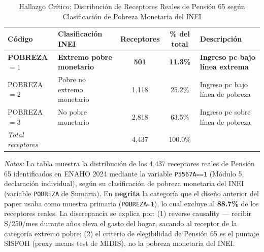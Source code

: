 \begin{table}[htbp]
\centering
\caption{Hallazgo Crítico: Distribución de Receptores Reales de Pensión 65 según Clasificación de Pobreza Monetaria del INEI}
\label{tab:pobreza_receptores}
\begin{threeparttable}
\begin{tabular}{l l cc l}
\toprule
Código & Clasificación INEI & Receptores & \% del total & Descripción \\
\midrule
  \textbf{POBREZA$=1$} & \textbf{Extremo pobre monetario} & \textbf{501} & \textbf{11.3\%} & \textbf{Ingreso pc bajo línea extrema} \\
  POBREZA$=2$ & Pobre no extremo monetario & 1{,}118 & 25.2\% & Ingreso pc bajo línea de pobreza \\
  POBREZA$=3$ & No pobre monetario & 2{,}818 & 63.5\% & Ingreso pc sobre línea de pobreza \\
\midrule
  \textit{Total receptores} & & 4{,}437 & 100.0\% & \\
\bottomrule
\end{tabular}
\begin{tablenotes}[flushleft]
\footnotesize
\item \textit{Notas:} La tabla muestra la distribución de los 4{,}437 receptores reales de Pensión 65 identificados en ENAHO 2024 mediante la variable \texttt{P5567A==1} (Módulo 5, declaración individual), según su clasificación de pobreza monetaria del INEI (variable \texttt{POBREZA} de Sumaria). En \textbf{negrita} la categoría que el diseño anterior del paper usaba como muestra primaria (\texttt{POBREZA=1}), lo cual excluye al \textbf{88.7\%} de los receptores reales. La discrepancia se explica por: (1) reverse causality — recibir S/250/mes durante años eleva el gasto del hogar, sacando al receptor de la categoría extremo pobre; (2) el criterio de elegibilidad de Pensión 65 es el puntaje SISFOH (proxy means test de MIDIS), no la pobreza monetaria del INEI.
\end{tablenotes}
\end{threeparttable}
\end{table}